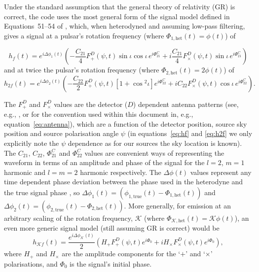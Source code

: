 Under the standard assumption that the general theory of relativity (GR) is correct, the code uses the most general form of
the signal model defined in Equations~51--54 of \citet{2015arXiv150105832J}, which, when heterodyned and assuming low-pass
filtering, gives a signal at a pulsar's rotation frequency (where $\Phi_{1,{\text{het}}}(t) = \phi(t)$) of
\begin{widetext}
\begin{equation}\label{eq:hf}
h_f(t) =  e^{i\Delta\phi_1(t)}\left(-\frac{C_{21}}{4}F^D_{+}(\psi,t)\sin{\iota}\cos{\iota}\,e^{i\Phi_{21}^C} +
i\frac{C_{21}}{4}F^D_{\times}(\psi,t)\sin{\iota}\,e^{i\Phi_{21}^C} \right)
\end{equation}
and at twice the pulsar's rotation frequency (where $\Phi_{2,{\text{het}}}(t) = 2\phi(t)$) of
\begin{equation}\label{eq:h2f}
h_{2f}(t) =  e^{i\Delta\phi_2(t)}\left(-\frac{C_{22}}{2}F^D_{+}(\psi,t)[1+\cos{}^2\iota]e^{i\Phi_{22}^C} +
iC_{22}F^D_{\times}(\psi,t)\cos{\iota}\,e^{i\Phi_{22}^C} \right).
\end{equation}
\end{widetext}
The $F^D_{+}$ and $F^D_{\times}$ values are the detector ($D$) dependent antenna patterns (see, e.g., \citet{1978PhRvD..17..379F,1987MNRAS.224..131S,2009PhRvD..79b2002F}, or
\citet{1998PhRvD..58f3001J} for the convention used within this document in, e.g., equation~\ref{eq:antenna}), which are a function of the
detector position, source sky position and source polarisation angle $\psi$ (in equations~\ref{eq:hf} and \ref{eq:h2f} we only
explicitly note the $\psi$ dependence as for our sources the sky location is known). The $C_{21}$, $C_{22}$,
$\Phi_{21}^C$ and $\Phi_{22}^C$ values are convenient ways of representing the waveform in terms of an
amplitude and phase of the signal for the $l=2$, $m=1$ harmonic and $l=m=2$ harmonic respectively. The
$\Delta\phi(t)$ values represent any time dependent phase deviation between the phase used in the heterodyne
and the true signal phase \citep[which does not necessarily have to precisely follow the electromagnetically observed rotational phase, see discussions in, e.g.,][]{2008ApJ...683L..45A}, so
$\Delta\phi_1(t) = (\phi_{1,{\text{true}}}(t)-\Phi_{1,{\text{het}}}(t))$ and $\Delta\phi_2(t) = (\phi_{2,{\text{true}}}(t)-\Phi_{2,{\text{het}}}(t))$. More generally,
for emission at an arbitrary scaling of the rotation frequency, $\mathcal{K}$ (where $\Phi_{\mathcal{K},{\text{het}}}(t) = \mathcal{K}\phi(t)$), an even more generic signal model (still assuming GR is correct) would be
\begin{equation}\label{eq:hkf}
h_{\mathcal{K}f}(t) =  \frac{e^{i\Delta\phi_{\mathcal{K}}(t)}}{2}\left(H_+F^D_{+}(\psi,t)e^{i\Phi_0} +
iH_{\times}F^D_{\times}(\psi,t)e^{i\Phi_{0}} \right),
\end{equation}
where $H_+$ and $H_{\times}$ are the amplitude components for the `$+$' and `$\times$' polarisations, and $\Phi_0$ is the signal's initial phase.

